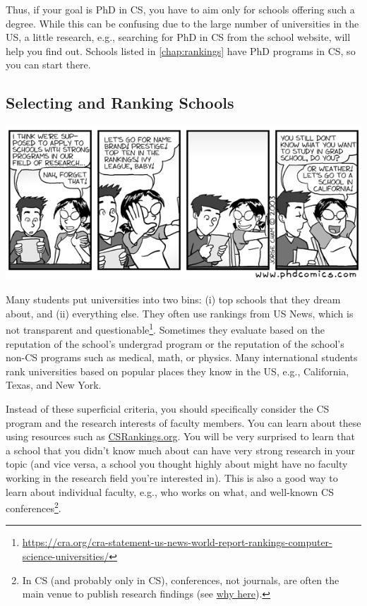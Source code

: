 \documentclass[oneside,11pt,dvipsnames]{book}
\begin{document}
Thus, if your goal is PhD in CS, you have to aim only for schools offering such a degree.  %
While this can be confusing due to the large number of universities in the US, a little research, e.g., searching for PhD in CS from the school website, will help you find out. Schools listed in \autoref{chap:rankings} have PhD programs in CS, so you can start there.


\subsection{Selecting and Ranking Schools}\label{sec:selecting-ranking-schools}
\begin{center}
  \includegraphics[scale=0.5]{files/c1.png}
\end{center}

Many students put universities into two bins: (i) top schools that they dream about, and (ii) everything else.  They often use rankings from US News, which is not transparent and questionable\footnote{\url{https://cra.org/cra-statement-us-news-world-report-rankings-computer-science-universities/}}.  Sometimes they evaluate based on the reputation of the school's undergrad program or the reputation of the school's non-CS programs such as medical, math, or physics.
Many international students rank universities based on popular places they know in the US, e.g., California, Texas, and New York.

Instead of these superficial criteria, you should specifically consider the CS program and the research interests of faculty members.
You can learn about these using resources such as \href{https://csrankings.org}{CSRankings.org}. You will be very surprised to learn that a school that you didn't know much about can have very strong research in your topic (and vice versa, a school you thought highly about might have no faculty working in the research field you're interested in). This is also a good way to learn about individual faculty, e.g., who works on what, and well-known CS conferences\footnote{In CS (and probably only in CS), conferences, not journals, are often the main venue to publish research findings (see \href{https://homes.cs.washington.edu/~mernst/advice/conferences-vs-journals.html}{why here}).}. %
\end{document}
